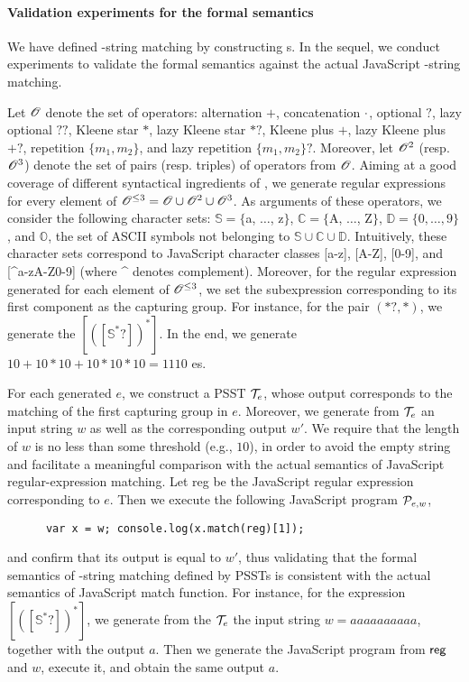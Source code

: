 \paragraph{Validation experiments for the formal semantics} \label{sect：valid}
We have defined %
{\regexp}-string matching by constructing {\PSST}s. %
In the sequel, we conduct experiments to validate the formal semantics against the actual JavaScript {\regexp}-string matching.

Let $\mathscr{O}$ denote the set of {\regexp} operators: alternation $+$, concatenation $\cdot$, optional $?$, lazy optional $??$, Kleene star $*$, lazy Kleene star $*?$, Kleene plus $+$, lazy Kleene plus $+?$, repetition $\{m_1,m_2\}$, and lazy repetition $\{m_1,m_2\}?$. Moreover, let $\mathscr{O}^{2}$ (resp. $\mathscr{O}^{3}$) denote the set of pairs (resp. triples) of operators from $\mathscr{O}$. 
Aiming at a good coverage of different syntactical ingredients of {\regexp}, we generate regular expressions for every element of $\mathscr{O}^{\le 3} = \mathscr{O} \cup \mathscr{O}^2 \cup \mathscr{O}^3$.
As arguments of these operators, we consider the following character sets: $\mathbb{S} = \{$a, $\ldots$, z$\}$, $\mathbb{C}=\{$A, $\ldots$, Z$\}$, $\mathbb{D} = \{0,\ldots,9\}$, and $\mathbb{O}$, the set of ASCII symbols not belonging to $\mathbb{S} \cup \mathbb{C} \cup \mathbb{D}$.
Intuitively, these character sets correspond to JavaScript character classes [a-z], [A-Z], [0-9], and [{\textasciicircum}a-zA-Z0-9] (where {\textasciicircum} denotes complement).
Moreover, for the regular expression generated for each element of $\mathscr{O}^{\le 3}$, we set the subexpression corresponding to its first component as the capturing group. 
For instance, for the pair $(*?, *)$, we generate the {\regexp} $[([\mathbb{S}^*?])^{*}]$. In the end, we generate $10+10*10+10*10*10 = 1110$ {\regexp}es. 

For each generated {\regexp} $e$, we construct a PSST $\mathcal{T}_e$, whose output corresponds to the matching of the first capturing group in $e$.  Moreover, we generate from $\mathcal{T}_e$ an input string $w$ as well as the corresponding output $w'$. We require that the length of $w$ is no less than some threshold (e.g., $10$), in order to avoid the empty string and facilitate a  meaningful comparison with the actual semantics of JavaScript regular-expression matching. 
Let {\sf reg} be the JavaScript regular expression corresponding to $e$. Then we execute the following JavaScript program $\mathcal{P}_{e,w}$,
\begin{center}
{
\small
\begin{verbatim}
      var x = w; console.log(x.match(reg)[1]);
\end{verbatim}
}
\end{center}
and confirm that its output is equal to $w'$, thus validating that the formal semantics of  \regexp-string matching defined by PSSTs is consistent with the actual semantics of JavaScript {\sf match} function. For instance, for the {\regexp} expression $[([\mathbb{S}^*?])^{*}]$, we generate from the $\mathcal{T}_e$ the input string $w= aaaaaaaaaa$, together with the output $a$. Then we generate  the JavaScript program from ${\sf reg}$ and $w$, execute it, and obtain the same output $a$.

